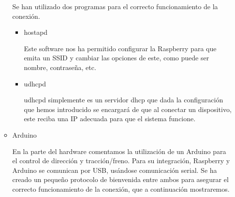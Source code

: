 \documentclass{pclass}
\begin{document}
\begin{itemize}
\begin{itemize}
	Se han utilizado dos programas para el correcto funcionamiento de la conexión.
	\medskip
		\begin{itemize}
			\item hostapd
			\smallskip
			
			Este software nos ha permitido configurar la Raspberry para que emita un SSID y cambiar las opciones de este, como puede ser nombre, contraseña, etc.
			\smallskip
			\medskip
			\item udhcpd
			\smallskip
			
			udhcpd simplemente es un servidor dhcp que dada la configuración que hemos introducido se encargará de que al conectar un dispositivo, este reciba una IP adecuada para que el sistema funcione.
			
		\end{itemize}
	\medskip
	\item Arduino
		\medskip
	
	En la parte del hardware comentamos la utilización de un Arduino para el control de dirección y tracción/freno. Para su integración, Raspberry y Arduino se comunican por USB, usándose comunicación serial. Se ha creado un pequeño protocolo de bienvenida entre ambos para asegurar el correcto funcionamiento de la conexión, que a continuación mostraremos.
	

\end{itemize}
\end{itemize}
\end{document}
